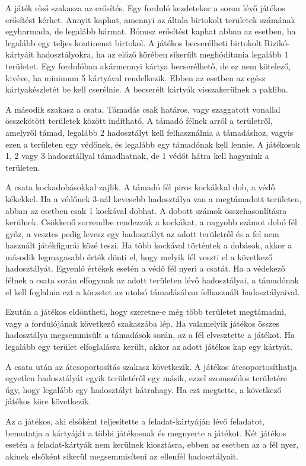 
A játék első szakasza az erősítés. Egy forduló kezdetekor a soron lévő játékos erősítést kérhet. Annyit kaphat, amennyi az általa birtokolt területek számának egyharmada, de legalább hármat. Bónusz erősítést kaphat abban az esetben, ha legalább egy teljes kontinenst birtokol. A játékos becserélheti birtokolt Rizikó-kártyáit hadosztályokra, ha az előző körében sikerült meghódítania legalább 1 területet. Egy fordulóban akármennyi kártya becserélhető, de ez nem kötelező, kivéve, ha minimum 5 kártyával rendelkezik. Ebben az esetben az egész kártyakészletét be kell cserélnie. A becserélt kártyák visszakerülnek a pakliba.\\


A második szakasz a csata. Támadás csak határos, vagy szaggatott vonallal összekötött területek között indítható. A támadó félnek arról a területről, amelyről támad, legalább 2 hadosztályt kell felhasználnia a támadáshoz, vagyis ezen a területen egy védőnek, és legalább egy támadónak kell lennie. A játékosok 1, 2 vagy 3 hadosztállyal támadhatnak, de 1 védőt hátra kell hagyniuk a területen.

A csata kockadobásokkal zajlik. A támadó fél piros kockákkal dob, a védő kékekkel. Ha a védőnek 3-nál kevesebb hadosztálya van a megtámadott területen, abban az esetben csak 1 kockával dobhat. A dobott számok összehasonlításra kerülnek. Csökkenő sorrendbe rendezzük a kockákat, a nagyobb számot dobó fél győz, a vesztes pedig levesz egy hadosztályt az adott területről és a fel nem használt játékfigurái közé teszi. Ha több kockával történtek a dobások, akkor a második legmagasabb érték dönti el, hogy melyik fél veszti el a következő hadosztályát. Egyenlő értékek esetén a védő fél nyeri a csatát. Ha a védekező félnek a csata során elfogynak az adott területen lévő hadosztályai, a támadónak el kell foglalnia ezt a körzetet az utolsó támadásában felhasznált hadosztályaival. 

Ezután a játékos eldöntheti, hogy szeretne-e még több területet megtámadni, vagy a fordulójának következő szakaszába lép. Ha valamelyik játékos összes hadosztálya megsemmisült a támadások során, az a fél elvesztette a játékot. Ha legalább egy terület elfoglalásra került, akkor az adott játékos kap egy kártyát.\\


A csata után az átcsoportosítás szakasz következik. A játékos átcsoportosíthatja egyetlen hadosztályát egyik területéről egy másik, ezzel szomszédos területére úgy, hogy legalább egy hadosztályt hátrahagy. Ha ezt megtette, a következő játékos köre következik.\\


Az a játékos, aki elsőként teljesítette a feladat-kártyáján lévő feladatot, bemutatja a kártyáját a többi játékosnak és megnyerte a játékot. Két játékos esetén a feladat-kártyák nem kerülnek kiosztásra, ebben az esetben az a fél nyer, akinek elsőként sikerül megsemmisíteni az ellenfél hadosztályait.
